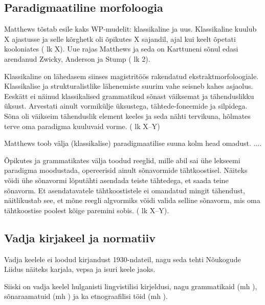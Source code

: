 \documentclass[12pt,a4paper]{article}
\begin{document}
\subsection{Paradigmaatiline morfoloogia}

Matthews tõstab esile kaks WP-mudelit: klassikaline ja uus. Klassikaline kuulub X ajastusse ja selle kõrghetk oli õpikutes X sajandil, ajal kui keelt õpetati kooloniates (\cite{matthews_morphology_1991} lk X). Uue rajas Matthews ja seda on Karttuneni sõnul edasi arendanud Zwicky, Anderson ja Stump (\cite{karttunen_computing_2003} lk 2).

Klassikaline on lähedasem siinses magistritöös rakendatud ekstraktmorfoloogiale. Klassikalise ja strukturalistlike lähenemiste suurim vahe seisneb kahes asjaolus. Eeskätt ei näinud klassikalised grammatikud sõnast väiksemat ja tähenduslikku üksust. Arvestati ainult vormikülje üksustega, tähtede-foneemide ja silpidega. Sõna oli väikseim tähenduslik element keeles ja seda nähti tervikuna, hõlmates terve oma paradigma kuuluvaid vorme. (\cite{matthews_morphology_1991} lk X--Y)

Matthews toob välja (klassikalise) paradigmaatilise suuna kolm head omadust. ....

Õpikutes ja grammatikates välja toodud reeglid, mille abil sai ühe lekseemi paradigma moodustada, opereerisid ainult sõnavormide tähtkoostisel. Näiteks võidi ühe sõnavormi lõputähti asendada teiste tähtedega, et saada teine sõnavorm. Et asendatavatele tähtkoostistele ei omandatud mingit tähendust, näitlikustab see, et mõne reegli algvormiks võidi valida selline sõnavorm, mis oma tähtkoostise poolest kõige paremini sobis. (\cite{matthews_morphology_1991} lk X--Y).





\subsection{Vadja kirjakeel ja normatiiv}
\label{sec:kirjakeel}

Vadja keelele ei loodud kirjandust 1930-ndateil, nagu seda tehti Nõukogude Liidus näiteks karjala, vepsa ja isuri keele jaoks. 

Siiski on vadja keelel hulganisti lingvistilisi kirjeldusi, nagu grammatikaid (mh \cites{ahlqvist_wotisk_1856}{airila_vatjan_1934}{tsvetkov_vadja_2008}{ariste_grammar_1968}{__2011}), sõnaraamatuid (mh \cites{tsvetkov_vatjan_1995}{ariste_vadja_1943}{laakso_vatjan_1989}{raag_dictionary_1982}{pomberg_vadja_1991}{grunberg_vadja_2013}{heinsoo_vadsonakopittoja_2015}) ja ka etnograafilisi töid (mh \cites{kass_kasitoo-_1961}{malk_vadja_1977}).
\end{document}
